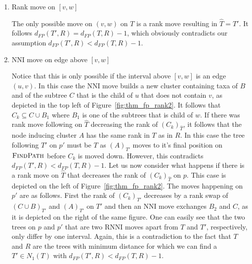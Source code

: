 \documentclass{amsart}
\newcommand{\rnni}{\mathrm{RNNI}}
\newcommand{\findpath}{\textsc{FindPath}}
\newcommand{\nni}{\mathrm{NNI}}
\begin{document}
\begin{enumerate}
    \item Rank move on $[v,w]$

    The only possible move on $(v,w)$ on $T$ is a rank move resulting in $\hat T = T'$.
    It follows $d_{FP}(T',R) = d_{FP}(T,R) - 1$, which obviously contradicts our assumption $d_{FP}(T',R) < d_{FP}(T,R) - 1$.

    \item $\nni$ move on edge above $[v,w]$

    Notice that this is only possible if the interval above $[v,w]$ is an edge $(u,v)$.
    In this case the $\nni$ move builds a new cluster containing taxa of $B$ and of the subtree $C$ that is the child of $u$ that does not contain $v$, as depicted in the top left of Figure~\ref{fig:thm_fp_rank2}.
    It follows that $C_k \subseteq C \cup B_1$ where $B_1$ is one of the subtrees that is child of $w$.
    If there was rank move following on $\hat T$ decreasing the rank of $(C_k)_{\hat T}$, it follows that the node inducing cluster $A$ has the same rank in $T$ as in $R$.
    In this case the tree following $T'$ on $p'$ must be $T$ as $(A)_{T'}$ moves to it's final position on $\findpath$ before $C_k$ is moved down.
    However, this contradicts $d_{FP}(T',R) < d_{FP}(T,R) - 1$.
    Let us now consider what happens if there is a rank move on $\hat T$ that decreases the rank of $(C_k)_{\hat T}$ on $p$.
    This case is depicted on the left of Figure~\ref{fig:thm_fp_rank2}.
    The moves happening on $p'$ are as follows.
    First the rank of $(C_k)_{T'}$ decreases by a rank swap of $(C \cup B)_{T'}$ and $(A)_{T'}$ on $T'$ and then an $\nni$ move exchanges $B_2$ and $C$, as it is depicted on the right of the same figure.
    One can easily see that the two trees on $p$ and $p'$ that are two $\rnni$ moves apart from $T$ and $T'$, respectively, only differ by one interval.
    Again, this is a contradiction to the fact that $T$ and $R$ are the trees with minimum distance for which we can find a $T' \in N_1(T)$ with $d_{FP}(T',R) < d_{FP}(T,R) - 1$.


\end{enumerate}
\end{document}
